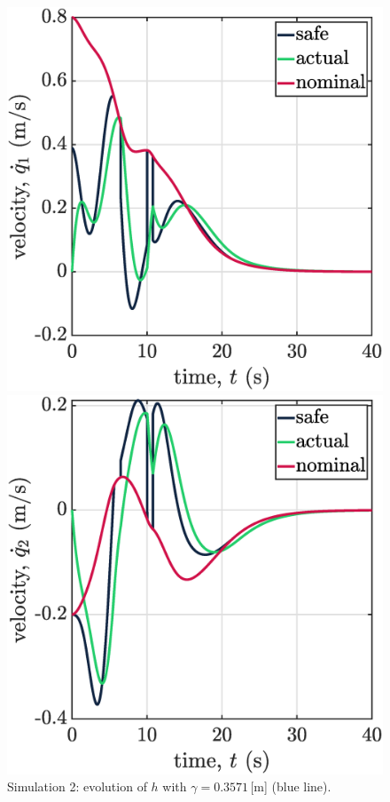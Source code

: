 \begin{figure}[!ht]
\begin{minipage}[b]{0.46\linewidth}
    \caption{\label{fig:sim2h}Simulation 2: evolution of $h$ with $\gamma = 0.3571\,[\mathrm{m}$] (blue line).}
    \end{minipage}
    \begin{minipage}[t]{.45\textwidth}
        \centering
        \includegraphics[width=\textwidth]{figures/sim2vel1.eps}
    \end{minipage}
    \hfill
    \begin{minipage}[t]{.45\textwidth}
        \centering
        \includegraphics[width=\textwidth]{figures/sim2vel2.eps}

\end{minipage}
\end{figure}
